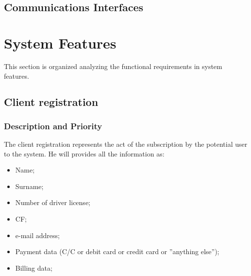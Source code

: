 \documentclass{scrreprt}
\begin{document}
\section{Communications Interfaces}
\begin{comment}$<$Describe the requirements associated with any communications functions 
required by this product, including e-mail, web browser, network server 
communications protocols, electronic forms, and so on. Define any pertinent 
message formatting. Identify any communication standards that will be used, such 
as FTP or HTTP. Specify any communication security or encryption issues, data 
transfer rates, and synchronization mechanisms.$>$
\end{comment}


\chapter{System Features}
This section is organized analyzing the functional requirements in system features.
\begin{comment}$<$This template illustrates organizing the functional requirements for the 
product by system features, the major services provided by the product. You may 
prefer to organize this section by use case, mode of operation, user class, 
object class, functional hierarchy, or combinations of these, whatever makes the 
most logical sense for your product.$>$
\end{comment}

\section{Client registration}
\begin{comment}$<$Don’t really say “System Feature 1.” State the feature name in just a few 
words.$>$
\end{comment}

\subsection{Description and Priority}
The client registration represents the act of the subscription by the potential user to the system. He will provides all the information as:

\begin{itemize}
\item Name;
\item Surname;
\item Number of driver license;
\item CF;
\item e-mail address;
\item Payment data (C/C or debit card or credit card or ''anything else'');
\item Billing data;
\end{itemize}
\end{document}
